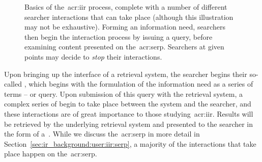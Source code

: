 \begin{figure}[t!]
    \centering
    \caption[Basics of the~\gls{acr:iir} process]{Basics of the~\gls{acr:iir} process, complete with a number of different searcher interactions that can take place (although this illustration may not be exhaustive). Forming an information need, searchers then begin the interaction process by issuing a query, before examining content presented on the~\gls{acr:serp}. Searchers at given points may decide to \emph{stop} their interactions.}
    \label{fig:iir}
\end{figure}

Upon bringing up the interface of a retrieval system, the searcher begins their so-called , which begins with the formulation of the information need as a series of terms -- or query. Upon submission of this query with the retrieval system, a complex series of  begin to take place between the system and the searcher, and these interactions are of great importance to those studying~\gls{acr:iir}. Results will be retrieved by the underlying retrieval system and presented to the searcher in the form of a~. While we discuss the~\gls{acr:serp} in more detail in Section~\ref{sec:ir_background:user:iir:serp}, a majority of the interactions that take place happen on the~\gls{acr:serp}.

